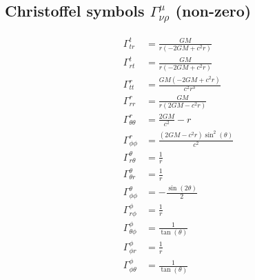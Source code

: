 \documentclass{article}
\begin{document}
\subsection{Christoffel symbols $\Gamma^{\mu}_{\nu\rho}$ (non-zero)}
\begin{align}
\Gamma^{t}_{t r} &= \frac{G M}{r \left(- 2 G M + c^{2} r\right)} \\ 
\Gamma^{t}_{r t} &= \frac{G M}{r \left(- 2 G M + c^{2} r\right)} \\ 
\Gamma^{r}_{t t} &= \frac{G M \left(- 2 G M + c^{2} r\right)}{c^{2} r^{3}} \\ 
\Gamma^{r}_{r r} &= \frac{G M}{r \left(2 G M - c^{2} r\right)} \\ 
\Gamma^{r}_{\theta \theta} &= \frac{2 G M}{c^{2}} - r \\ 
\Gamma^{r}_{\phi \phi} &= \frac{\left(2 G M - c^{2} r\right) \sin^{2}{\left(\theta \right)}}{c^{2}} \\ 
\Gamma^{\theta}_{r \theta} &= \frac{1}{r} \\ 
\Gamma^{\theta}_{\theta r} &= \frac{1}{r} \\ 
\Gamma^{\theta}_{\phi \phi} &= - \frac{\sin{\left(2 \theta \right)}}{2} \\ 
\Gamma^{\phi}_{r \phi} &= \frac{1}{r} \\ 
\Gamma^{\phi}_{\theta \phi} &= \frac{1}{\tan{\left(\theta \right)}} \\ 
\Gamma^{\phi}_{\phi r} &= \frac{1}{r} \\ 
\Gamma^{\phi}_{\phi \theta} &= \frac{1}{\tan{\left(\theta \right)}} \\ 
\end{align}
\end{document}
